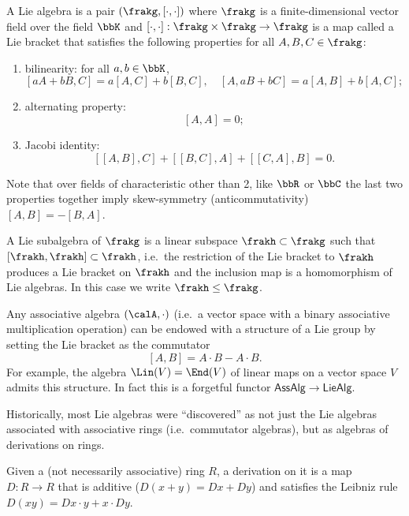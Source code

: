 \begin{defn}
    A Lie algebra is a pair $(\frakg,[\cdot,\cdot])$ where $\frakg$ is a finite-dimensional vector field over the field $\bbK$ and $[\cdot,\cdot]:\frakg\times\frakg\to\frakg$ is a map called a Lie bracket that satisfies the following properties for all $A,B,C\in \frakg$:
    \begin{enumerate}
        \item bilinearity: for all $a,b\in \bbK$,
        \[[aA+bB,C]=a[A,C]+b[B,C],\quad [A,aB+bC]=a[A,B]+b[A,C];\]
        \item alternating property:
        \[[A,A]=0;\]
        \item Jacobi identity:
        \[[[A,B],C]+[[B,C],A]+[[C,A],B]=0.\]
    \end{enumerate}
    Note that over fields of characteristic other than 2, like $\bbR$ or $\bbC$ the last two properties together imply skew-symmetry (anticommutativity) $[A,B]=-[B,A]$.

    A Lie subalgebra of $\frakg$ is a linear subspace $\frakh\subset\frakg$ such that $[\frakh,\frakh]\subset\frakh$, i.e.~the restriction of the Lie bracket to $\frakh$ produces a Lie bracket on $\frakh$ and the inclusion map is a homomorphism of Lie algebras. In this case we write $\frakh\leq \frakg$.
\end{defn}


\begin{example}
    Any associative algebra $(\calA,\cdot)$ (i.e.~a vector space with a binary associative multiplication operation) can be endowed with a structure of a Lie group by setting the Lie bracket as the commutator
    \[[A,B]=A\cdot B-A\cdot B.\]
    For example, the algebra $\Lin(V)=\End(V)$ of linear maps on a vector space $V$ admits this structure. In fact this is a forgetful functor $\mathsf{AssAlg}\to\mathsf{LieAlg}$.
\end{example}

Historically, most Lie algebras were ``discovered'' as not just the Lie algebras associated with associative rings (i.e.~commutator algebras), but as algebras of derivations on rings.

\begin{defn}[Derivation]
    Given a (not necessarily associative) ring $R$, a derivation on it is a map $D:R\to R$ that is additive ($D(x+y)=Dx+Dy$) and satisfies the Leibniz rule $D(xy)=Dx\cdot y+x\cdot Dy$.
\end{defn}

